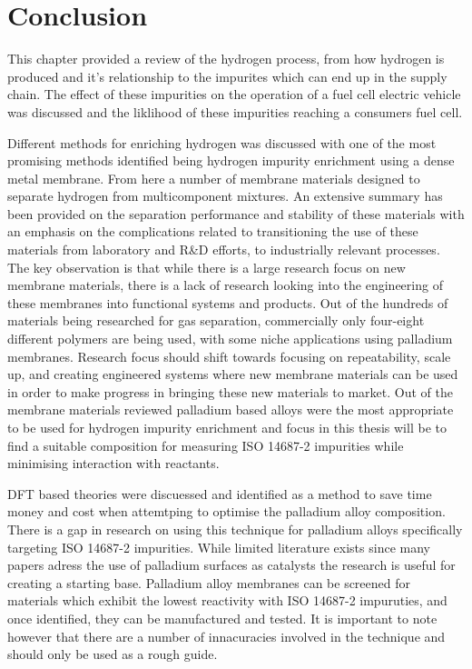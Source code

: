     \eject \pdfpagewidth=8.3in \pdfpageheight=11.7in


\section{Conclusion}
This chapter provided a review of the hydrogen process, from how hydrogen is produced and it's relationship to the impurites which can end up in the supply chain. The effect of these impurities on the operation of a fuel cell electric vehicle was discussed and the liklihood of these impurities reaching a consumers fuel cell. 

Different methods for enriching hydrogen was discussed with one of the most promising methods identified being hydrogen impurity enrichment using a dense metal membrane. From here a number of membrane materials designed to separate hydrogen from multicomponent mixtures. An extensive summary has been provided on the separation performance and stability of these materials with an emphasis on the complications related to transitioning the use of these materials from laboratory and  R\&D efforts, to industrially relevant processes. The key observation is that while there is a large research focus on new membrane materials, there is a lack of research looking into the engineering of these membranes into functional systems and products. Out of the hundreds of materials being researched for gas separation, commercially only four-eight different polymers are being used, with some niche applications using palladium membranes. Research focus should shift towards focusing on repeatability, scale up, and creating engineered systems where new membrane materials can be used in order to make progress in bringing these new materials to market. Out of the membrane materials reviewed palladium based alloys were the most appropriate to be used for hydrogen impurity enrichment and focus in this thesis will be to find a suitable composition for measuring ISO 14687-2 impurities while minimising interaction with reactants. 

DFT based theories were discuessed and identified as a method to save time money and cost when attemtping to optimise the palladium alloy composition. There is a gap in research on using this technique for palladium alloys specifically targeting ISO 14687-2 impurities. While limited literature exists since many papers adress the use of palladium surfaces as catalysts the research is useful for creating a starting base. Palladium alloy membranes can be screened for materials which exhibit the lowest reactivity with ISO 14687-2 impuruties, and once identified, they can be manufactured and tested. It is important to note however that there are a number of innacuracies involved in the technique and should only be used as a rough guide. 





